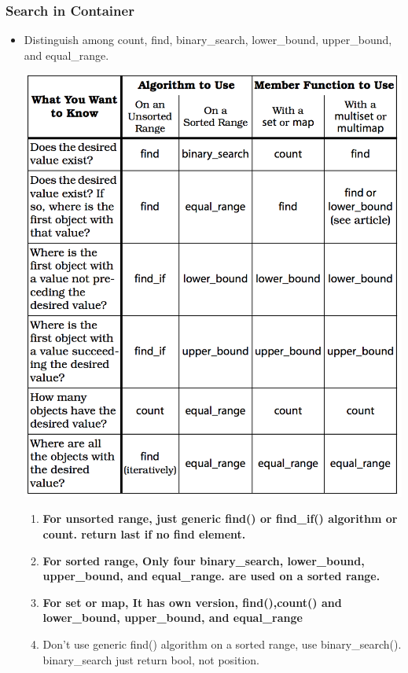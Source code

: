 \documentclass[a4paper,12pt,twoside]{book}
\begin{document}
\subsubsection{Search in Container}
\begin{itemize}
\item Distinguish among count, find, binary\_search, lower\_bound, upper\_bound, and equal\_range.

\includegraphics[scale=0.6]{pics/distinguish.png}

\begin{enumerate}
\item \textbf{For unsorted range, just generic find() or find\_if() algorithm or  count. return last if no find element.}
\item \textbf{For sorted range, Only four binary\_search, lower\_bound, upper\_bound, and equal\_range. are used on a sorted range.}
\item \textbf{For set or map, It has own version, find(),count() and lower\_bound, upper\_bound, and equal\_range}
\item Don't use generic find() algorithm on a sorted range,  use binary\_search(). binary\_search just return bool, not position.


\end{enumerate}
\end{itemize}
\end{document}
